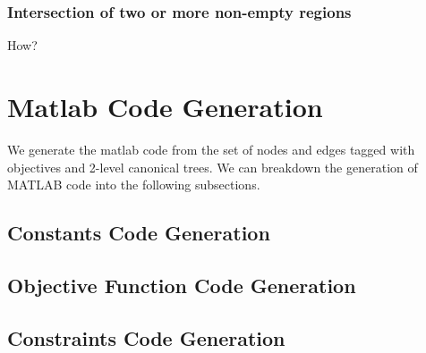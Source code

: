 \documentclass[letterpaper, 10pt, conference]{ieeeconf}   %
\begin{document}
\subsubsection{Intersection of two or more non-empty regions}
How?

\section{Matlab Code Generation}
We generate the matlab code from the set of nodes and edges tagged with
objectives and 2-level canonical trees. We can breakdown the generation of
MATLAB code into the following subsections.

\subsection{Constants Code Generation} 
\subsection{Objective Function Code Generation} 
\subsection{Constraints Code Generation}




\end{document}
